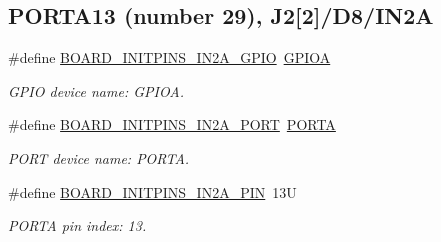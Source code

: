 \subsection*{P\+O\+R\+T\+A13 (number 29), J2\mbox{[}2\mbox{]}/\+D8/\+I\+N2A}
\begin{DoxyCompactItemize}
\item 
\mbox{\label{group__pin__mux_ga77c37cad5bf29f274a29f1cbea158f7f}} 
\#define \mbox{\hyperlink{group__pin__mux_ga77c37cad5bf29f274a29f1cbea158f7f}{B\+O\+A\+R\+D\+\_\+\+I\+N\+I\+T\+P\+I\+N\+S\+\_\+\+I\+N2\+A\+\_\+\+G\+P\+IO}}~\mbox{\hyperlink{group___g_p_i_o___peripheral___access___layer_gac485358099728ddae050db37924dd6b7}{G\+P\+I\+OA}}
\begin{DoxyCompactList}\small\item\em G\+P\+IO device name\+: G\+P\+I\+OA. \end{DoxyCompactList}\item 
\mbox{\label{group__pin__mux_ga72db835e36e49d5b62d8c36f706cf441}} 
\#define \mbox{\hyperlink{group__pin__mux_ga72db835e36e49d5b62d8c36f706cf441}{B\+O\+A\+R\+D\+\_\+\+I\+N\+I\+T\+P\+I\+N\+S\+\_\+\+I\+N2\+A\+\_\+\+P\+O\+RT}}~\mbox{\hyperlink{group___p_o_r_t___peripheral___access___layer_ga7c8a7f98a98d8cb125dd57a66720ab30}{P\+O\+R\+TA}}
\begin{DoxyCompactList}\small\item\em P\+O\+RT device name\+: P\+O\+R\+TA. \end{DoxyCompactList}\item 
\mbox{\label{group__pin__mux_ga064b95d6e24f705131fec66765204fbf}} 
\#define \mbox{\hyperlink{group__pin__mux_ga064b95d6e24f705131fec66765204fbf}{B\+O\+A\+R\+D\+\_\+\+I\+N\+I\+T\+P\+I\+N\+S\+\_\+\+I\+N2\+A\+\_\+\+P\+IN}}~13U
\begin{DoxyCompactList}\small\item\em P\+O\+R\+TA pin index\+: 13. \end{DoxyCompactList}\end{DoxyCompactItemize}
